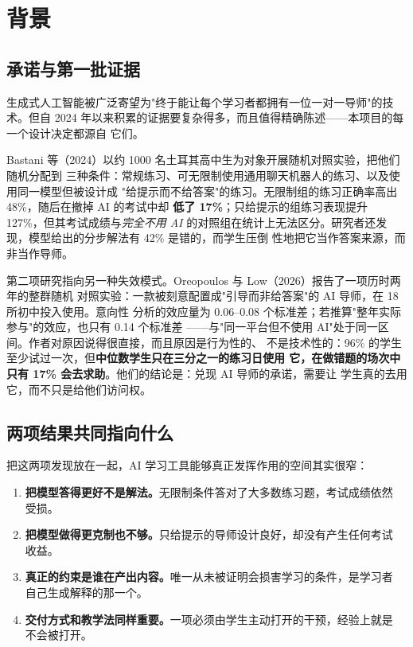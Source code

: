 \documentclass[11pt,a4paper,UTF8,fontset=windows]{ctexart}
\begin{document}
\section{背景}

\subsection{承诺与第一批证据}

生成式人工智能被广泛寄望为"终于能让每个学习者都拥有一位一对一导师"的技术。但自
2024 年以来积累的证据要复杂得多，而且值得精确陈述——本项目的每一个设计决定都源自
它们。

Bastani 等（2024）以约 1000 名土耳其高中生为对象开展随机对照实验，把他们随机分配到
三种条件：常规练习、可无限制使用通用聊天机器人的练习、以及使用同一模型但被设计成
"给提示而不给答案"的练习。无限制组的练习正确率高出 48\%，随后在撤掉 AI 的考试中却
\textbf{低了 17\%}；只给提示的组练习表现提升 127\%，但其考试成绩与\emph{完全不用 AI}
的对照组在统计上无法区分。研究者还发现，模型给出的分步解法有 42\% 是错的，而学生压倒
性地把它当作答案来源，而非当作导师。

第二项研究指向另一种失效模式。Oreopoulos 与 Low（2026）报告了一项历时两年的整群随机
对照实验：一款被刻意配置成"引导而非给答案"的 AI 导师，在 18 所初中投入使用。意向性
分析的效应量为 0.06--0.08 个标准差；若推算"整年实际参与"的效应，也只有 0.14 个标准差
——与"同一平台但不使用 AI"处于同一区间。作者对原因说得很直接，而且原因是行为性的、
不是技术性的：96\% 的学生至少试过一次，但\textbf{中位数学生只在三分之一的练习日使用
它，在做错题的场次中只有 17\% 会去求助}。他们的结论是：兑现 AI 导师的承诺，需要让
学生真的去用它，而不只是给他们访问权。

\subsection{两项结果共同指向什么}

把这两项发现放在一起，AI 学习工具能够真正发挥作用的空间其实很窄：

\begin{enumerate}
  \item \textbf{把模型答得更好不是解法。}无限制条件答对了大多数练习题，考试成绩依然
  受损。
  \item \textbf{把模型做得更克制也不够。}只给提示的导师设计良好，却没有产生任何考试
  收益。
  \item \textbf{真正的约束是谁在产出内容。}唯一从未被证明会损害学习的条件，是学习者
  自己生成解释的那一个。
  \item \textbf{交付方式和教学法同样重要。}一项必须由学生主动打开的干预，经验上就是
  不会被打开。
\end{enumerate}
\end{document}
